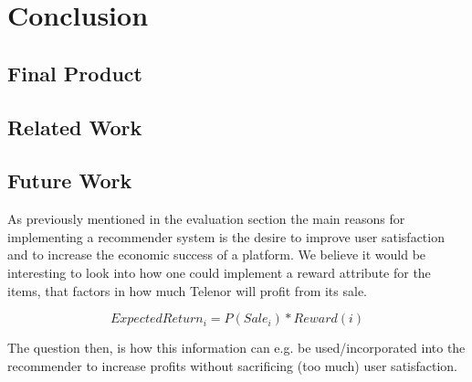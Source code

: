 
\chapter{Conclusion}
\minitoc

\clearpage

\section{Final Product}


\section{Related Work}


\section{Future Work}



As previously mentioned in the evaluation section the main reasons for implementing a recommender
system is the desire to improve user satisfaction and to increase the economic success of a platform.
We believe it would be interesting to look into how one could implement a reward attribute for the
items, that factors in how much Telenor will profit from its sale.

\begin{equation}
ExpectedReturn_i = P(Sale_i) * Reward(i)
\end{equation}

The question then, is how this information can e.g. be used/incorporated into the recommender to
increase profits without sacrificing (too much) user satisfaction.



